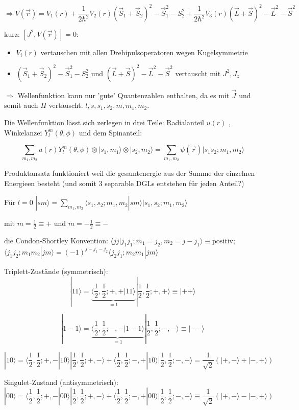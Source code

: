 \[\Rightarrow  V(\vec r) = V_1(r) + \frac{1}{2\hbar^2 }V_2(r)(\vec S_1+\vec S_2)^2-\vec S_1^2-S_2^2 +  \frac{1}{2\hbar^2}V_3(r) (\vec L+\vec S)^2 -\vec L^2-\vec S^2\]

kurz: \([J^2,V(\vec r)]=0\):
\begin{itemize}
\item \(V_i(r)\) vertauschen mit allen Drehipulsoperatoren wegen Kugelsymmetrie
\item  \((\vec S_1+\vec S_2)^2-\vec S_1^2-S_2^2\) und \( (\vec L+\vec S)^2 -\vec L^2-\vec S^2\) vertauscht mit \(J^2,J_z\)
\end{itemize}


\(\Rightarrow \) Wellenfunktion kann nur 'gute' Quantenzahlen enthalten, da es mit \(\vec J\) und somit auch \(H\) vertauscht. \(l,s,s_1,s_2,m,m_1,m_2\). 

Die Wellenfunktion lässt sich zerlegen in drei Teile: Radialanteil \(u(r)\) , Winkelanzei \(Y^m_l(\theta,\phi)\) und dem Spinanteil:

\[ \sum_{m_1,m_2} u(r) Y^m_l(\theta,\phi)\otimes |s_1,m_1\rangle \otimes|s_2,m_2\rangle = \sum_{m_1,m_2} \psi(\vec r)|s_1s_2;m_1,m_2\rangle \]

Produktansatz funktioniert weil die gesamtenergie aus der Summe der einzelnen Energieen besteht (und somit 3 separable DGLs entstehen für jeden Anteil?) 

Für \(l=0\)
\(|sm\rangle = \sum_{m_1,m_2}\langle s_1,s_2;m_1,m_2 |sm\rangle  |s_1,s_2;m_1,m_2\rangle \)

mit \(m=\frac{1}{2}\equiv +\) und \(m=-\frac{1}{2}\equiv -\)

die Condon-Shortley Konvention: \(\langle jj|j_1j_1;m_1=j_2,m_2=j-j_1\rangle \equiv \text{positiv}\); \(\langle j_1j_2;m_1m_2|jm\rangle = (-1)^{j-j_1-j_2}\langle j_2 j_1; m_2 m_1| j m\rangle\)


Triplett-Zustände (symmetrisch):
\[|11\rangle = \underbrace{\langle \frac{1}{2},\frac{1}{2};+,+|11\rangle }_{=1}|\frac{1}{2},\frac{1}{2};+,+\rangle\equiv |++\rangle \]


\[|1-1\rangle = \underbrace{\langle \frac{1}{2},\frac{1}{2};-,-|1-1\rangle }_{=1}|\frac{1}{2},\frac{1}{2};-,-\rangle\equiv |--\rangle \]


\[|10\rangle = \langle \frac{1}{2},\frac{1}{2};+,-|10\rangle |\frac{1}{2},\frac{1}{2};+,-\rangle + \langle \frac{1}{2},\frac{1}{2};-,+|10\rangle |\frac{1}{2},\frac{1}{2};-,+\rangle = \frac{1}{\sqrt{2}}(|+,-\rangle+|-,+\rangle)\]

Singulet-Zustand (antisymmetrisch):
\[|00\rangle = \langle \frac{1}{2},\frac{1}{2};+,-|00\rangle |\frac{1}{2},\frac{1}{2};+,-\rangle + \langle \frac{1}{2},\frac{1}{2};-,+|00\rangle |\frac{1}{2},\frac{1}{2};-,+\rangle \equiv \frac{1}{\sqrt{2}}(|+,-\rangle-|-,+\rangle)\]




